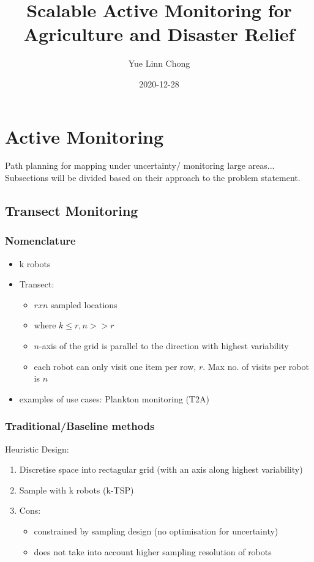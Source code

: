 \documentclass{article}
\title{Scalable Active Monitoring for Agriculture and Disaster Relief}
\date{2020-12-28}
\author{Yue Linn Chong}
\begin{document}
  \maketitle
  \newpage
  \section{Active Monitoring}
  Path planning for mapping under uncertainty/ monitoring large areas...
  Subsections will be divided based on their approach to the problem statement.
  \subsection{Transect Monitoring}
    \subsubsection{Nomenclature}
      \begin{itemize}
        \item k robots
        \item Transect:
        \begin{itemize}
          \item ${r x n}$ sampled locations
          \item where $k \leq r, n >> r $
          \item $n$-axis of the grid is parallel to the direction with highest variability
          \item each robot can only visit one item per row, $r$. Max no. of visits per robot is $n$
        \end{itemize}
        \item examples of use cases: Plankton monitoring (T2A)
      \end{itemize}
   \subsubsection{Traditional/Baseline methods}
   Heuristic Design:
   \begin{enumerate}
     \item Discretise space into rectagular grid (with an axis along highest variability)
     \item Sample with k robots (\Gls{k-TSP})
     \item Cons:
     \begin{itemize}
      \item constrained by sampling design (no optimisation for uncertainty)
      \item does not take into account higher sampling resolution of robots
    \end{itemize}
   \end{enumerate}
\end{document}
